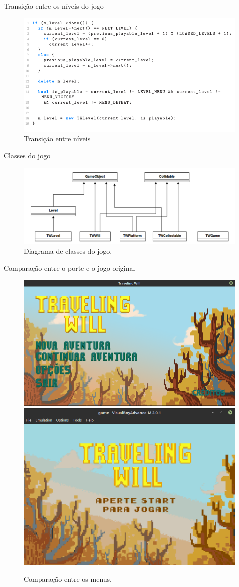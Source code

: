 \documentclass[notes, mathserif]{beamer}
\begin{document}
\begin{frame}{Transi\c c\~ao entre os n\'iveis do jogo}
	\begin{figure}[H]
		\includegraphics[width=.8\linewidth]{figuras/transicao.png}
		\centering
		\caption{Transi\c c\~ao entre n\'iveis}
		\label{fig:vsync}
	\end{figure}
\end{frame}

\begin{frame}{Classes do jogo}
	\begin{figure}[H]
		\includegraphics[width=1\linewidth]{figuras/classes.png}
		\centering
		\caption{Diagrama de classes do jogo.}
		\label{fig:vsync}
	\end{figure}
\end{frame}

\begin{frame}{Compara\c c\~ao entre o porte e o jogo original}
	\begin{figure}%
    \includegraphics[width=.5\linewidth]{figuras/pc-menu.png}
    \qquad
    \includegraphics[width=.4\linewidth]{figuras/gba-menu.png}
    \caption{Compara\c c\~ao entre os menus.}%
    \label{fig:comp1}%
	\end{figure}
\end{frame}
\end{document}
